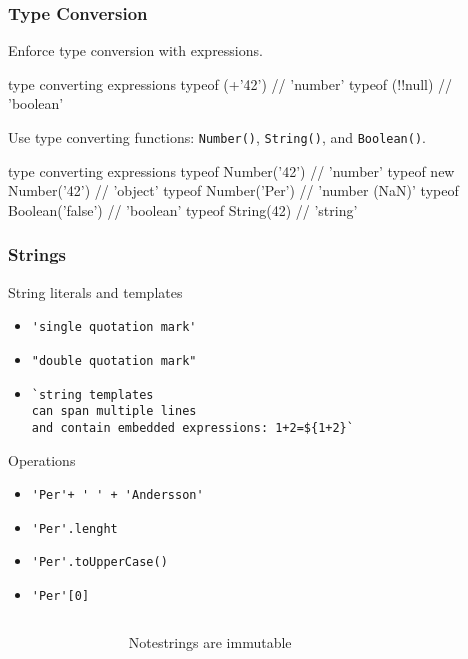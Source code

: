 \begin{frame}[fragile]
  \frametitle{Type Conversion}
  Enforce type conversion with expressions.\\
  \begin{CodeBox}{ type converting expressions}
typeof (+'42') // 'number'
typeof (!!null) // 'boolean'
  \end{CodeBox}
  \vspace{5mm}
  Use type converting functions: \verb|Number()|, \verb|String()|, and \verb|Boolean()|.
  \begin{CodeBox}{ type converting expressions}
typeof Number('42') // 'number'
typeof new Number('42') // 'object'
typeof Number('Per') // 'number (NaN)'
typeof Boolean('false') // 'boolean'
typeof String(42) // 'string'
  \end{CodeBox}
\end{frame}

\begin{frame}[fragile]
  \frametitle{Strings}
String literals and templates
\begin{itemize}
  \item \verb|'single quotation mark'|
  \item \verb|"double quotation mark"|
  \item \verb|`string templates| \\
           \verb|can span multiple lines| \\
           \verb|and contain embedded expressions: 1+2=${1+2}`|
\end{itemize}
Operations
\begin{itemize}
  \item \verb|'Per'+ ' ' + 'Andersson'|
  \item \verb|'Per'.lenght|
  \item \verb|'Per'.toUpperCase()|
  \item \verb|'Per'[0]|
\end{itemize}
\begin{columns}[onlytextwidth]
  \begin{column}{0.3\textwidth}  \end{column}
  \begin{column}{0.4\textwidth}
    \begin{alertblock}{Note}strings are immutable \end{alertblock}
  \end{column}
  \begin{column}{0.3\textwidth}  \end{column}
\end{columns}%
 \end{frame}
